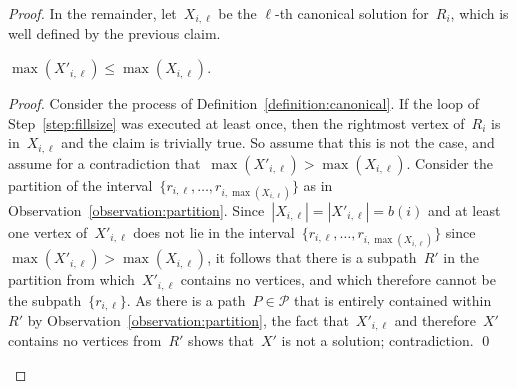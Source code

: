 \let\accentvec\vec  \documentclass{llncs}
\newcommand{\claimqed}{\renewcommand{\squareforqed}{$\lrcorner$}\qed\renewcommand{\squareforqed}{\plainsquareforqed}}
\renewcommand{\P}{\ensuremath{\mathcal{P}}\xspace}
\begin{document}
\begin{proof}
In the remainder, let~$X_{i,\ell}$ be the $\ell$-th canonical solution for~$R_i$, which is well defined by the previous claim.

\begin{claim}
$\max(X'_{i,\ell}) \leq \max(X_{i,\ell})$.
\end{claim}
\begin{proof}
Consider the process of Definition~\ref{definition:canonical}. If the loop of Step~\ref{step:fillsize} was executed at least once, then the rightmost vertex of~$R_i$ is in~$X_{i,\ell}$ and the claim is trivially true. So assume that this is not the case, and assume for a contradiction that~$\max(X'_{i,\ell}) > \max(X_{i,\ell})$. Consider the partition of the interval~$\{r_{i,\ell}, \ldots, r_{i,\max(X_{i,\ell})}\}$ as in Observation~\ref{observation:partition}. Since~$|X_{i,\ell}| = |X'_{i,\ell}| = b(i)$ and at least one vertex of~$X'_{i,\ell}$ does not lie in the interval~$\{r_{i,\ell}, \ldots, r_{i,\max(X_{i,\ell})}\}$ since~$\max(X'_{i,\ell}) > \max(X_{i,\ell})$, it follows that there is a subpath~$R'$ in the partition from which~$X'_{i,\ell}$ contains no vertices, and which therefore cannot be the subpath~$\{r_{i,\ell}\}$. As there is a path~$P \in \P$ that is entirely contained within~$R'$ by Observation~\ref{observation:partition}, the fact that~$X'_{i,\ell}$ and therefore~$X'$ contains no vertices from~$R'$ shows that~$X'$ is not a solution; contradiction.
\claimqed
\end{proof}


\end{proof}
\end{document}

